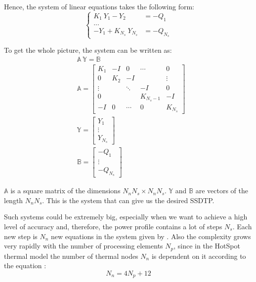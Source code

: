 Hence, the system of linear equations takes the following form:
\[
  \begin{cases}
    K_1 \: Y_1 - Y_2 & = -Q_1 \\
    ... \\
    -Y_1 + K_{N_s} \: Y_{N_s} & = -Q_{N_s}
  \end{cases}
\]

To get the whole picture, the system can be written as:
\begin{align}
  & \mathbb{A} \: \mathbb{Y} = \mathbb{B} \label{eq:system} \\
  & \mathbb{A} = \left[
    \begin{array}{ccccc}
      K_1 & -I & 0 & \cdots & 0 \\
      0 & K_2 & -I &  & \vdots \\
      \vdots &  & \ddots & -I & 0 \\
      0 &  &  & K_{N_s - 1} & -I \\
      -I & 0 & \cdots & 0 & K_{N_s}
    \end{array}
  \right] \nonumber \\
  & \mathbb{Y} = \left[
    \begin{array}{c}
      Y_1 \\
      \vdots \\
      Y_{N_s}
    \end{array}
  \right] \nonumber \\
  & \mathbb{B} = \left[
    \begin{array}{c}
      -Q_1 \\
      \vdots \\
      -Q_{N_s}
    \end{array}
  \right] \nonumber
\end{align}

$\mathbb{A}$ is a square matrix of the dimensions $N_n N_s \times N_n N_s$. $\mathbb{Y}$ and $\mathbb{B}$ are vectors of the length $N_n N_s$. This is the system that can give us the desired SSDTP.

Such systems could be extremely big, especially when we want to achieve a high level of accuracy and, therefore, the power profile contains a lot of steps $N_s$. Each new step is $N_n$ new equations in the system given by . Also the complexity grows very rapidly with the number of processing elements $N_p$, since in the HotSpot thermal model the number of thermal nodes $N_n$ is dependent on it according to the equation \cite{rao2008}:
\[
  N_n = 4 N_p + 12
\]

